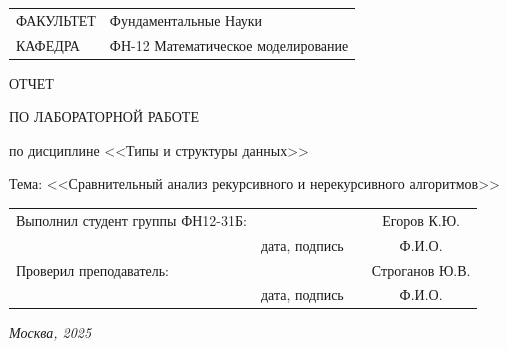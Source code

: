 \documentclass[14pt]{article}
\begin{document}
	\fontsize{14}{21}\selectfont
	
	\begin{tabularx}{\textwidth}{l >{\centering\arraybackslash}X}
		ФАКУЛЬТЕТ & \flqq Фундаментальные Науки\frqq \\ 
		
		КАФЕДРА & ФН-12 \flqq Математическое моделирование\frqq \\ 
	\end{tabularx}
	
	
	\vspace{1cm}
	
	
	\begin{center}
		\begin{bf}
			
			\fontsize{24}{36}\selectfont
			ОТЧЕТ
			
			\fontsize{20}{30}\selectfont
			ПО ЛАБОРАТОРНОЙ РАБОТЕ 
			
			\fontsize{20}{30}\selectfont
			по дисциплине <<Типы и структуры данных>>
			
			Тема: <<Сравнительный анализ рекурсивного и нерекурсивного алгоритмов>>
			
		\end{bf}
	\end{center}
	
	\fontsize{14}{21}\selectfont
	\vspace{5cm}
	
	
	\noindent\begin{tabularx}{\textwidth}{ X >{\centering}p{4cm} p{1cm} c }
		Выполнил студент группы ФН12-31Б: & & & Егоров К.Ю.\\ \cline{2-2} \cline{4-4}
		& \fontsize{10}{15}\selectfont дата, подпись & & \fontsize{10}{15}\selectfont Ф.И.О. \\
		Проверил преподаватель: & & & Строганов Ю.В.\\ \cline{2-2} \cline{4-4}
		& \fontsize{10}{15}\selectfont дата, подпись & & \fontsize{10}{15}\selectfont Ф.И.О.
		
	\end{tabularx}
	
	\vspace{\fill}
	
	\begin{center}
		\it{Москва}, 2025
	\end{center}
	
	\thispagestyle{empty}
	
	\newpage
	\renewcommand{\contentsname}{\centering{\foreignlanguage{russian}{СОДЕРЖАНИЕ}}}
	\setcounter{page}{2}
	\tableofcontents
	
\end{document}
